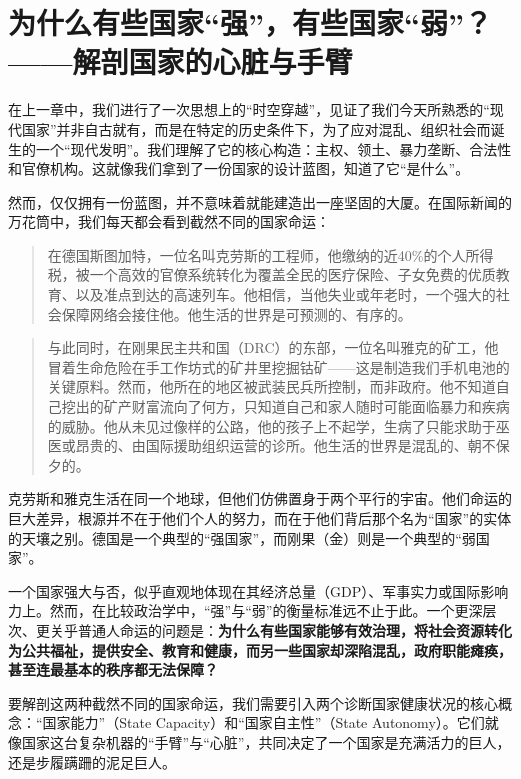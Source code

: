 

\chapter{为什么有些国家“强”，有些国家“弱”？——解剖国家的心脏与手臂}

在上一章中，我们进行了一次思想上的“时空穿越”，见证了我们今天所熟悉的“现代国家”并非自古就有，而是在特定的历史条件下，为了应对混乱、组织社会而诞生的一个“现代发明”。我们理解了它的核心构造：主权、领土、暴力垄断、合法性和官僚机构。这就像我们拿到了一份国家的设计蓝图，知道了它“是什么”。

然而，仅仅拥有一份蓝图，并不意味着就能建造出一座坚固的大厦。在国际新闻的万花筒中，我们每天都会看到截然不同的国家命运：

\begin{quote}
在德国斯图加特，一位名叫克劳斯的工程师，他缴纳的近40\%的个人所得税，被一个高效的官僚系统转化为覆盖全民的医疗保险、子女免费的优质教育、以及准点到达的高速列车。他相信，当他失业或年老时，一个强大的社会保障网络会接住他。他生活的世界是可预测的、有序的。
\end{quote}

\begin{quote}
与此同时，在刚果民主共和国（DRC）的东部，一位名叫雅克的矿工，他冒着生命危险在手工作坊式的矿井里挖掘钴矿——这是制造我们手机电池的关键原料。然而，他所在的地区被武装民兵所控制，而非政府。他不知道自己挖出的矿产财富流向了何方，只知道自己和家人随时可能面临暴力和疾病的威胁。他从未见过像样的公路，他的孩子上不起学，生病了只能求助于巫医或昂贵的、由国际援助组织运营的诊所。他生活的世界是混乱的、朝不保夕的。
\end{quote}

克劳斯和雅克生活在同一个地球，但他们仿佛置身于两个平行的宇宙。他们命运的巨大差异，根源并不在于他们个人的努力，而在于他们背后那个名为“国家”的实体的天壤之别。德国是一个典型的“强国家”，而刚果（金）则是一个典型的“弱国家”。

一个国家强大与否，似乎直观地体现在其经济总量（GDP）、军事实力或国际影响力上。然而，在比较政治学中，“强”与“弱”的衡量标准远不止于此。一个更深层次、更关乎普通人命运的问题是：\textbf{为什么有些国家能够有效治理，将社会资源转化为公共福祉，提供安全、教育和健康，而另一些国家却深陷混乱，政府职能瘫痪，甚至连最基本的秩序都无法保障？}

要解剖这两种截然不同的国家命运，我们需要引入两个诊断国家健康状况的核心概念：“国家能力”（State Capacity）和“国家自主性”（State Autonomy）。它们就像国家这台复杂机器的“手臂”与“心脏”，共同决定了一个国家是充满活力的巨人，还是步履蹒跚的泥足巨人。


